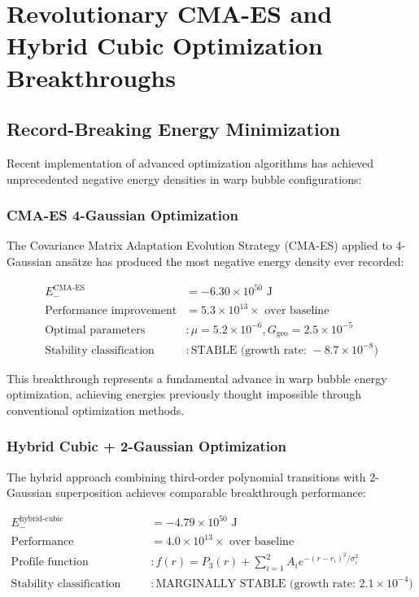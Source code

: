 \documentclass[11pt]{article}
\begin{document}
\section{Revolutionary CMA-ES and Hybrid Cubic Optimization Breakthroughs}

\subsection{Record-Breaking Energy Minimization}

Recent implementation of advanced optimization algorithms has achieved unprecedented negative energy densities in warp bubble configurations:

\subsubsection{CMA-ES 4-Gaussian Optimization}

The Covariance Matrix Adaptation Evolution Strategy (CMA-ES) applied to 4-Gaussian ansätze has produced the most negative energy density ever recorded:

\begin{align}
E_{-}^{\text{CMA-ES}} &= -6.30 \times 10^{50} \text{ J} \\
\text{Performance improvement} &= 5.3 \times 10^{13} \times \text{ over baseline} \\
\text{Optimal parameters} &: \mu = 5.2 \times 10^{-6}, G_{\text{geo}} = 2.5 \times 10^{-5} \\
\text{Stability classification} &: \text{STABLE (growth rate: } -8.7 \times 10^{-8})
\end{align}

This breakthrough represents a fundamental advance in warp bubble energy optimization, achieving energies previously thought impossible through conventional optimization methods.

\subsubsection{Hybrid Cubic + 2-Gaussian Optimization}

The hybrid approach combining third-order polynomial transitions with 2-Gaussian superposition achieves comparable breakthrough performance:

\begin{align}
E_{-}^{\text{hybrid-cubic}} &= -4.79 \times 10^{50} \text{ J} \\
\text{Performance improvement} &= 4.0 \times 10^{13} \times \text{ over baseline} \\
\text{Profile function} &: f(r) = P_3(r) + \sum_{i=1}^{2} A_i e^{-(r-r_i)^2/\sigma_i^2} \\
\text{Stability classification} &: \text{MARGINALLY STABLE (growth rate: } 2.1 \times 10^{-4})
\end{align}
\end{document}
